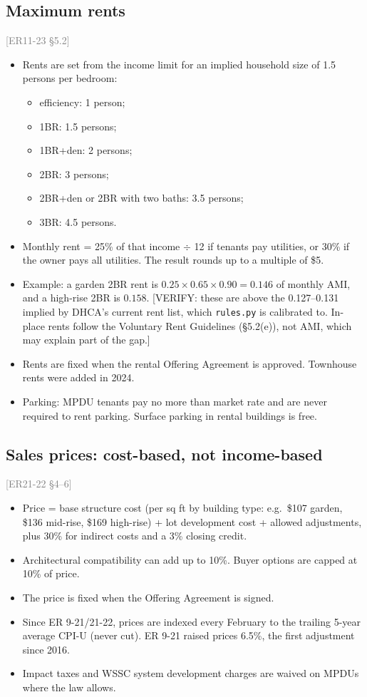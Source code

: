 \documentclass[11pt]{article}
\newcommand{\verify}[1]{\textcolor{red!70!black}{[VERIFY: #1]}}
\newcommand{\src}[1]{\textcolor{gray}{\small[#1]}}
\begin{document}
\subsection*{Maximum rents}
\src{ER11-23 \S5.2}
\begin{itemize}
  \item Rents are set from the income limit for an implied household size of 1.5 persons per bedroom:
    \begin{itemize}
      \item efficiency: 1 person;
      \item 1BR: 1.5 persons;
      \item 1BR+den: 2 persons;
      \item 2BR: 3 persons;
      \item 2BR+den or 2BR with two baths: 3.5 persons;
      \item 3BR: 4.5 persons.
    \end{itemize}
  \item Monthly rent = 25\% of that income $\div$ 12 if tenants pay utilities, or 30\% if the owner pays all utilities. The result rounds up to a multiple of \$5.
  \item Example: a garden 2BR rent is $0.25\times0.65\times0.90=0.146$ of monthly AMI, and a high-rise 2BR is $0.158$. \verify{these are above the 0.127--0.131 implied by DHCA's current rent list, which \texttt{rules.py} is calibrated to. In-place rents follow the Voluntary Rent Guidelines (\S5.2(e)), not AMI, which may explain part of the gap.}
  \item Rents are fixed when the rental Offering Agreement is approved. Townhouse rents were added in 2024.
  \item Parking: MPDU tenants pay no more than market rate and are never required to rent parking. Surface parking in rental buildings is free.
\end{itemize}

\subsection*{Sales prices: cost-based, not income-based}
\src{ER21-22 \S4--6}
\begin{itemize}
  \item Price = base structure cost (per sq ft by building type: e.g.\ \$107 garden, \$136 mid-rise, \$169 high-rise) + lot development cost + allowed adjustments, plus 30\% for indirect costs and a 3\% closing credit.
  \item Architectural compatibility can add up to 10\%. Buyer options are capped at 10\% of price.
  \item The price is fixed when the Offering Agreement is signed.
  \item Since ER 9-21/21-22, prices are indexed every February to the trailing 5-year average CPI-U (never cut). ER 9-21 raised prices 6.5\%, the first adjustment since 2016.
  \item Impact taxes and WSSC system development charges are waived on MPDUs where the law allows.
\end{itemize}
\end{document}
